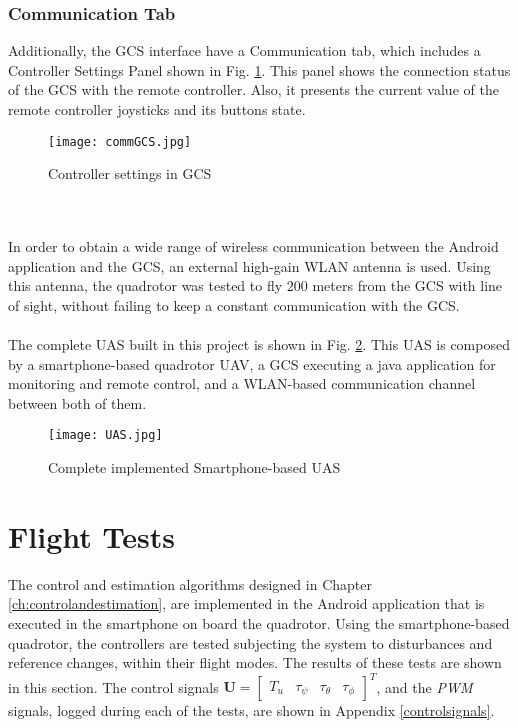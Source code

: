 \subsubsection*{Communication Tab}
Additionally, the GCS interface have a Communication tab, which includes a Controller Settings Panel shown in Fig. \ref{fig:commGCS}. This panel shows the connection status of the GCS with the remote controller. Also, it presents the current value of the remote controller joysticks and its buttons state.
\begin{figure}[h]
\begin{center}
\texttt{[image: commGCS.jpg]}  
\caption{Controller settings in GCS} 
\label{fig:commGCS}
\end{center}
\end{figure}
\\\\
In order to obtain a wide range of wireless communication between the Android application and the GCS, an external high-gain WLAN antenna is used. Using this antenna, the quadrotor was tested to fly $200$ meters from the GCS with line of sight, without failing to keep a constant communication with the GCS.
\\\\
The complete UAS built in this project is shown in Fig. \ref{fig:UAS}. This UAS is composed by a smartphone-based quadrotor UAV, a GCS executing a java application for monitoring and remote control, and a WLAN-based communication channel between both of them.
\begin{figure}[h]
\begin{center}
\texttt{[image: UAS.jpg]}  
\caption{Complete implemented Smartphone-based UAS} 
\label{fig:UAS}
\end{center}
\end{figure}

\section{Flight Tests} \label{sec:tests}
The control and estimation algorithms designed in Chapter \ref{ch:controlandestimation}, are implemented in the Android application that is executed in the smartphone on board the quadrotor. Using the smartphone-based quadrotor, the controllers are tested subjecting the system to disturbances and reference changes, within their flight modes. The results of these tests are shown in this section. The control signals $\mathbf{U} = \begin{bmatrix}
T_u & \tau_\psi & \tau_\theta & \tau_\phi
\end{bmatrix}^{T}$, and the \textit{PWM} signals, logged during each of the tests, are shown in Appendix \ref{controlsignals}.

